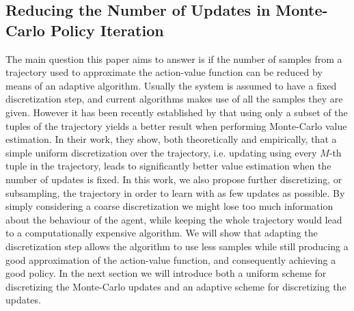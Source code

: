 \subsection{Reducing the Number of Updates in Monte-Carlo Policy Iteration}
The main question this paper aims to answer is if the number of samples from a trajectory used to approximate the action-value function can be reduced by means of an adaptive algorithm. Usually the system is assumed to have a fixed discretization step, and current algorithms makes use of all the samples they are given. However it has been recently established by \cite{zhang2024managing} that using only a subset of the tuples of the trajectory yields a better result when performing Monte-Carlo value estimation. In their work, they show, both theoretically and empirically, that a simple uniform discretization over the trajectory, i.e. updating using every $M$-th tuple in the trajectory, leads to significantly better value estimation when the number of updates is fixed. In this work, we also propose further discretizing, or subsampling, the trajectory in order to learn with as few updates as possible. By simply considering a coarse discretization we might lose too much information about the behaviour of the agent, while keeping the whole trajectory would lead to a computationally expensive algorithm. We will show that adapting the discretization step allows the algorithm to use less samples while still producing a good approximation of the action-value function, and consequently achieving a good policy. In the next section we will introduce both a uniform scheme for discretizing the Monte-Carlo updates and an adaptive scheme for discretizing the updates.
